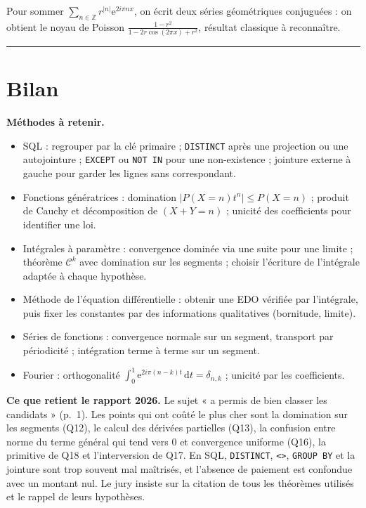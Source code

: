 \documentclass[11pt,a4paper]{article}
\providecommand{\tightlist}{\setlength{\itemsep}{0pt}\setlength{\parskip}{0pt}}
\begin{document}
\begin{methode}

Pour sommer \(\sum_{n\in\mathbb{Z}}r^{|n|}{\mathrm{e}}^{2i\pi nx}\), on écrit deux séries géométriques conjuguées : on obtient le noyau de Poisson \(\frac{1-r^2}{1-2r\cos(2\pi x)+r^2}\), résultat classique à reconnaître.

\end{methode}

\begin{center}\rule{0.5\linewidth}{0.5pt}\end{center}

\hypertarget{bilan}{%
\section{Bilan}\label{bilan}}

\textbf{Méthodes à retenir.}

\begin{itemize}
\tightlist
\item
  SQL : regrouper par la clé primaire ; \texttt{DISTINCT} après une projection ou une autojointure ; \texttt{EXCEPT} ou \texttt{NOT\ IN} pour une non-existence ; jointure externe à gauche pour garder les lignes sans correspondant.
\item
  Fonctions génératrices : domination \(|P(X=n)t^n|\le P(X=n)\) ; produit de Cauchy et décomposition de \((X+Y=n)\) ; unicité des coefficients pour identifier une loi.
\item
  Intégrales à paramètre : convergence dominée via une suite pour une limite ; théorème \({\mathcal{C}}^k\) avec domination sur les segments ; choisir l'écriture de l'intégrale adaptée à chaque hypothèse.
\item
  Méthode de l'équation différentielle : obtenir une EDO vérifiée par l'intégrale, puis fixer les constantes par des informations qualitatives (bornitude, limite).
\item
  Séries de fonctions : convergence normale sur un segment, transport par périodicité ; intégration terme à terme sur un segment.
\item
  Fourier : orthogonalité \(\int_0^1{\mathrm{e}}^{2i\pi(n-k)t}\,\mathrm{d}t=\delta_{n,k}\) ; unicité par les coefficients.
\end{itemize}

\textbf{Ce que retient le rapport 2026.} Le sujet « a permis de bien classer les candidats » (p.~1). Les points qui ont coûté le plus cher sont la domination sur les segments (Q12), le calcul des dérivées partielles (Q13), la confusion entre norme du terme général qui tend vers 0 et convergence uniforme (Q16), la primitive de Q18 et l'interversion de Q17. En SQL, \texttt{DISTINCT}, \texttt{\textless{}\textgreater{}}, \texttt{GROUP\ BY} et la jointure sont trop souvent mal maîtrisés, et l'absence de paiement est confondue avec un montant nul. Le jury insiste sur la citation de tous les théorèmes utilisés et le rappel de leurs hypothèses.
\end{document}
